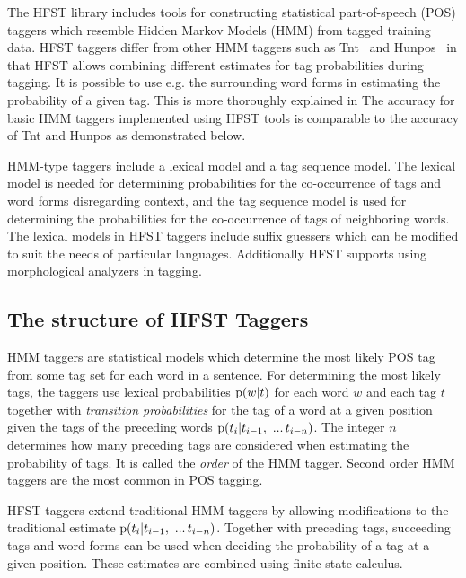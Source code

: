 \documentclass{llncs}
\begin{document}

The HFST library includes tools for constructing statistical
part-of-speech (POS) taggers which resemble Hidden Markov Models (HMM) from
tagged training data. HFST taggers differ from other HMM taggers such
as Tnt~\cite{Brants:2000} and Hunpos~\cite{Halascy:2007} in that HFST
allows combining different estimates for tag probabilities during
tagging. It is possible to use e.g. the surrounding word forms in
estimating the probability of a given tag. This is more thoroughly
explained in \cite{silfverberg/2010/icetal,silfverberg/2011/nodalida} The
accuracy for basic HMM taggers implemented using HFST tools is
comparable to the accuracy of Tnt and Hunpos as demonstrated below.

HMM-type taggers include a lexical model and a tag sequence model. The
lexical model is needed for determining probabilities for the
co-occurrence of tags and word forms disregarding context, and the tag
sequence model is used for determining the probabilities for the
co-occurrence of tags of neighboring words. The lexical models in
HFST taggers include suffix guessers which can be modified to suit
the needs of particular languages. Additionally HFST supports using
morphological analyzers in tagging.

\subsection{The structure of HFST Taggers}

HMM taggers are statistical models which determine the most likely
POS tag from some tag set for each word in a sentence. For
determining the most likely tags, the taggers use
lexical probabilities ${\rm p}(w|t)$ for each word $w$ and each tag
$t$ together with \emph{transition probabilities} for the tag of a
word at a given position given the tags of the preceding words ${\rm
  p}(t_i | t_{i - 1},\ ...\, t_{i-n})$. The integer $n$ determines how
many preceding tags are considered when estimating the probability of
tags. It is called the \emph{order} of the HMM tagger. Second order HMM
taggers are the most common in POS tagging.

HFST taggers extend traditional HMM taggers by allowing modifications
to the traditional estimate ${\rm p}(t_i | t_{i - 1},\ ...\,
t_{i-n})$. Together with preceding tags, succeeding tags and word
forms can be used when deciding the probability of a tag at a given
position. These estimates are combined using finite-state calculus.
\end{document}
